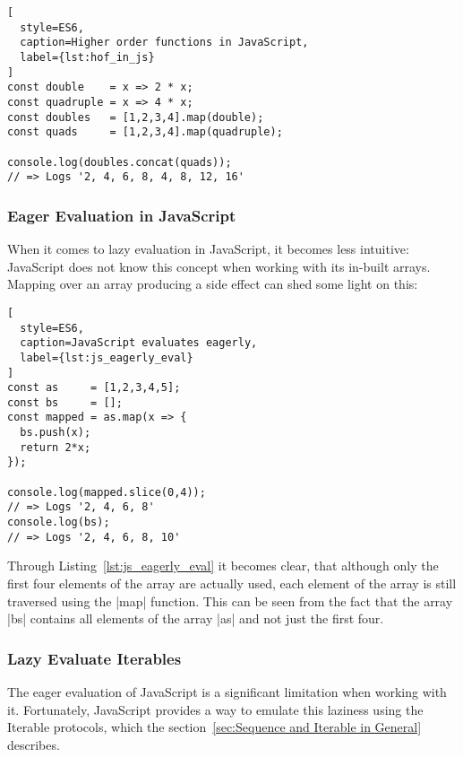 \begin{lstlisting}[
  style=ES6,
  caption=Higher order functions in JavaScript,
  label={lst:hof_in_js}
]
const double    = x => 2 * x;
const quadruple = x => 4 * x;
const doubles   = [1,2,3,4].map(double);
const quads     = [1,2,3,4].map(quadruple);

console.log(doubles.concat(quads));
// => Logs '2, 4, 6, 8, 4, 8, 12, 16'
\end{lstlisting}

\subsubsection{Eager Evaluation in JavaScript} %
\label{subsub:Eager Evaluation in JavaScript}

When it comes to lazy evaluation in JavaScript, it becomes less intuitive:
JavaScript does not know this concept when working with its in-built arrays.
Mapping over an array producing a side effect can shed some light on this:

\begin{lstlisting}[
  style=ES6,
  caption=JavaScript evaluates eagerly,
  label={lst:js_eagerly_eval}
]
const as     = [1,2,3,4,5];
const bs     = [];
const mapped = as.map(x => {
  bs.push(x);
  return 2*x;
});

console.log(mapped.slice(0,4));
// => Logs '2, 4, 6, 8'
console.log(bs);
// => Logs '2, 4, 6, 8, 10'
\end{lstlisting}

Through Listing~\ref{lst:js_eagerly_eval} it becomes clear, that although only
the first four elements of the array are actually used, each element of the
array is still traversed using the |map| function. This can be seen from the
fact that the array |bs| contains all elements of the array |as| and not just
the first four.

\subsubsection{Lazy Evaluate Iterables} %
\label{Lazy Evaluate Iterables}

The eager evaluation of JavaScript is a significant limitation when working with it.
Fortunately, JavaScript provides a way to emulate this laziness using the
Iterable protocols, which the section~\ref{sec:Sequence and Iterable in General}
describes. \\ 

